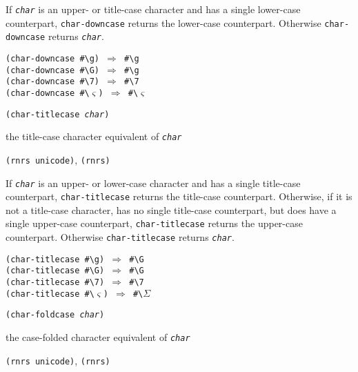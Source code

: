 If \texttt{\textit{char}} is an upper- or title-case character and has a single
lower-case counterpart, \texttt{char-downcase} returns the lower-case
counterpart.
Otherwise \texttt{char-downcase} returns \texttt{\textit{char}}.


\begin{alltt}
(char-downcase \#{}\textbackslash{}g) \(\Rightarrow\) \#{}\textbackslash{}g
(char-downcase \#{}\textbackslash{}G) \(\Rightarrow\) \#{}\textbackslash{}g
(char-downcase \#{}\textbackslash{}7) \(\Rightarrow\) \#{}\textbackslash{}7
(char-downcase \#{}\textbackslash{}\(\varsigma\)) \(\Rightarrow\) \#{}\textbackslash{}\(\varsigma\)
\end{alltt}

\begin{description}

\label{objects_s208}\item[procedure] \texttt{(char-titlecase \textit{char})}



\item[returns] the title-case character equivalent of \texttt{\textit{char}}


\item[libraries] \texttt{(rnrs unicode)}, \texttt{(rnrs)}
\end{description}


If \texttt{\textit{char}} is an upper- or lower-case character and has a single
title-case counterpart, \texttt{char-titlecase} returns the title-case
counterpart.
Otherwise, if it is not a title-case character, has no single title-case
counterpart, but does have a single upper-case counterpart,
\texttt{char-titlecase} returns the upper-case counterpart.
Otherwise \texttt{char-titlecase} returns \texttt{\textit{char}}.


\begin{alltt}
(char-titlecase \#{}\textbackslash{}g) \(\Rightarrow\) \#{}\textbackslash{}G
(char-titlecase \#{}\textbackslash{}G) \(\Rightarrow\) \#{}\textbackslash{}G
(char-titlecase \#{}\textbackslash{}7) \(\Rightarrow\) \#{}\textbackslash{}7
(char-titlecase \#{}\textbackslash{}\(\varsigma\)) \(\Rightarrow\) \#{}\textbackslash{}\(\Sigma\)
\end{alltt}

\begin{description}

\label{objects_s209}\item[procedure] \texttt{(char-foldcase \textit{char})}



\item[returns] the case-folded character equivalent of \texttt{\textit{char}}


\item[libraries] \texttt{(rnrs unicode)}, \texttt{(rnrs)}
\end{description}


